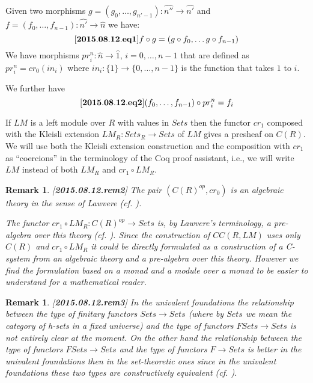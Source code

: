 \documentclass[11pt]{article}
\newenvironment{eq}{\begin{equation}}{\end{equation}}
\newtheorem{remark}[proposition]{Remark}
\newcommand{\llabel}[1]{\label{#1}[{\bf #1}]}
\newcommand{\sr}{\rightarrow}
\newcommand{\wh}{\widehat}
\begin{document}
Given two morphisms $g=(g_0,\dots,g_{n'-1}):\wh{n''}\sr \wh{n'}$ and $f=(f_0,\dots,f_{n-1}):\wh{n'}\sr \wh{n}$ we have:
%
\begin{eq}\llabel{2015.08.12.eq1}
f\circ g=(g\circ f_0,\dots g\circ f_{n-1})
\end{eq}  
%
We have morphisms $pr_i^n:\wh{n}\sr \wh{1}$, $i=0,\dots,n-1$ that are defined as $pr_i^n=cr_0(in_i)$ where $in_i:\{1\}\sr \{0,\dots,n-1\}$ is the function that takes $1$ to $i$.

We further have
%
\begin{eq}\llabel{2015.08.12.eq2}
(f_0,\dots,f_{n-1})\circ pr_i^n=f_i
\end{eq}
%

If $LM$ is a left module over $R$ with values in $Sets$ then the functor $cr_1$ composed with the Kleisli extension $LM_R:Sets_R\sr Sets$ of $LM$  gives a presheaf on $C(R)$. We will use both the Kleisli extension construction and the composition with $cr_1$ as ``coercions'' in the terminology of the Coq proof assistant, i.e., we will write $LM$ instead of both $LM_R$ and $cr_1\circ LM_R$. 
%
\begin{remark}\rm
\llabel{2015.08.12.rem2}
The pair $(C(R)^{op}, cr_0)$ is an algebraic theory in the sense of Lawvere (cf. \cite[Definition on p.62]{Lawvere}). 

The functor $cr_1\circ LM_R:C(R)^{op}\sr Sets$ is, by Lawvere's terminology, a pre-algebra over this theory (cf. \cite[Ch. III, \S 1]{Lawvere}). Since the construction of $CC(R,LM)$ uses only $C(R)$ and $cr_1\circ LM_R$ it could be directly formulated as a construction of a C-system from an algebraic theory and a pre-algebra over this theory. However we find the formulation based on a monad and a module over a monad to be easier to understand for a mathematical reader. 
\end{remark}
%
\begin{remark}\rm
\llabel{2015.08.12.rem3}
In the univalent foundations the relationship between the type of finitary functors $Sets\sr Sets$ (where by $Sets$ we mean the category of h-sets in a fixed universe) and the type of functors $FSets\sr Sets$ is not entirely clear at the moment. On the other hand the relationship between the type of functors $FSets\sr Sets$ and the type of functors $F\sr Sets$ is better in the univalent foundations then in the set-theoretic ones since in the univalent foundations these two types are constructively equivalent (cf. \cite[Theorem 8.4]{RezkCompletion}).
\end{remark}
%
\end{document}
